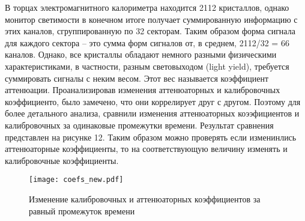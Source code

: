   В торцах электромагнитного калориметра находится 2112 кристаллов, однако монитор светимости в конечном итоге получает суммированную информацию с этих каналов, сгруппированную по 32 секторам. Таким образом форма сигнала для каждого сектора -- это сумма форм сигналов от, в среднем, 2112/32 = 66 каналов. Однако, все кристаллы обладают немного разными физическими характеристиками, в частности, разным световыходом (light yield), требуется суммировать сигналы с неким весом. Этот вес называется коэффициент аттенюации. Проанализировав изменения аттенюаторных и калибровочных коэффициенто, было замечено, что они коррелирует друг с другом. Поэтому для более детального анализа, сравнили изменения аттенюаторных коээфициентов и калибровочных за одинаковые промежутки времени. Результат сравнения представлен на рисунке 12. Таким образом можно проверять если изменинлись аттенюаторные коэффициенты, то на соответствующую величину изменять и калибровочные коэффициенты.
\newpage
\begin{figure}[htp]
  \centering
  \texttt{[image: coefs\_new.pdf]}
  \caption{Изменение калибровочных и аттенюаторных коэффициентов за равный промежуток времени}
  \label{fig:galaxy}
\end{figure}
